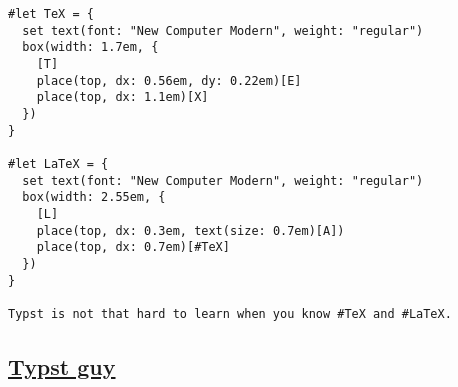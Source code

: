 \begin{verbatim}
#let TeX = {
  set text(font: "New Computer Modern", weight: "regular")
  box(width: 1.7em, {
    [T]
    place(top, dx: 0.56em, dy: 0.22em)[E]
    place(top, dx: 1.1em)[X]
  })
}

#let LaTeX = {
  set text(font: "New Computer Modern", weight: "regular")
  box(width: 2.55em, {
    [L]
    place(top, dx: 0.3em, text(size: 0.7em)[A])
    place(top, dx: 0.7em)[#TeX]
  })
}

Typst is not that hard to learn when you know #TeX and #LaTeX.
\end{verbatim}

\pandocbounded{}

\subsection{\texorpdfstring{\hyperref[typst-guy]{Typst
guy}}{Typst guy}}\label{typst-guy}

